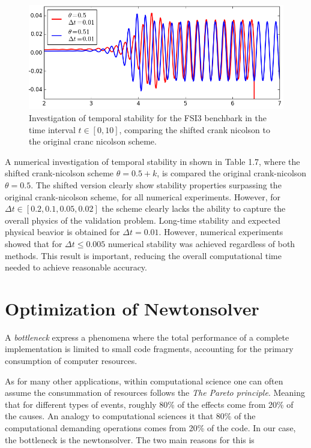 \newpage

\begin{figure}[h!]
 	\centering
    \includegraphics[scale=0.6]{./Fig/besttheta.png}
      \caption{Investigation of temporal stability for the FSI3 benchbark in the time interval $t \in [0, 10]$, comparing the shifted crank nicolson to the original cranc nicolson scheme. }
\end{figure}

A numerical investigation of temporal stability in shown in Table 1.7, where the shifted crank-nicolson scheme $\theta = 0.5 + k$, is compared the original crank-nicolson $\theta = 0.5$. The shifted version clearly show stability properties surpassing the original crank-nicolson scheme, for all numerical experiments. However, for $\Delta t \in [0.2, 0.1, 0.05, 0.02]$ the scheme clearly lacks the ability to capture the overall physics of the validation problem. Long-time stability and expected physical beavior is obtained for $\Delta t = 0.01$. However, numerical experiments showed that for $\Delta t \leq 0.005$ numerical stability was achieved regardless of both methods. This result is important, reducing the overall computational time needed to achieve reasonable accuracy.


\newpage
\section{Optimization of Newtonsolver}
A \textit{bottleneck} express a phenomena where the total performance of a complete implementation is limited to small code fragments, accounting for the primary consumption of computer resources.

As for many other applications, within computational science one can often assume the consummation of resources follows the \textit{The Pareto principle}. Meaning that for different types of events, roughly 80\% of the effects come from 20\% of the causes. An analogy to computational sciences it that 80\% of the computational demanding operations comes from 20\% of the code. In our case, the bottleneck is the newtonsolver. The two main reasons for this is 

